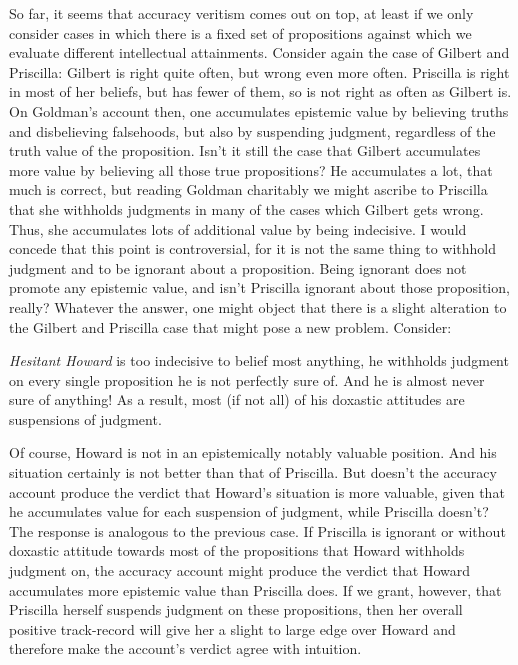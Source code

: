\documentclass[12pt,numbers=noenddot]{scrartcl}
\begin{document}
So far, it seems that accuracy veritism comes out on top, at least if we only consider cases in which there is a fixed set of propositions against which we evaluate different intellectual attainments. Consider again the case of Gilbert and Priscilla: Gilbert is right quite often, but wrong even more often. Priscilla is right in most of her beliefs, but has fewer of them, so is not right as often as Gilbert is. On Goldman's account then, one accumulates epistemic value by believing truths and disbelieving falsehoods, but also by suspending judgment, regardless of the truth value of the proposition. Isn't it still the case that Gilbert accumulates more value by believing all those true propositions? He accumulates a lot, that much is correct, but reading Goldman charitably we might ascribe to Priscilla that she withholds judgments in many of the cases which Gilbert gets wrong. Thus, she accumulates lots of additional value by being indecisive. I would concede that this point is controversial, for it is not the same thing to withhold judgment and to be ignorant about a proposition. Being ignorant does not promote any epistemic value, and isn't Priscilla ignorant about those proposition, really? Whatever the answer, one might object that there is a slight alteration to the Gilbert and Priscilla case that might pose a new problem. Consider:

\begin{description}
    \item \emph{Hesitant Howard} is too indecisive to belief most anything, he withholds judgment on every single proposition he is not perfectly sure of. And he is almost never sure of anything! As a result, most (if not all) of his doxastic attitudes are suspensions of judgment.
\end{description}

Of course, Howard is not in an epistemically notably valuable position. And his situation certainly is not better than that of Priscilla. But doesn't the accuracy account produce the verdict that Howard's situation is more valuable, given that he accumulates value for each suspension of judgment, while Priscilla doesn't? The response is analogous to the previous case. If Priscilla is ignorant or without doxastic attitude towards most of the propositions that Howard withholds judgment on, the accuracy account might produce the verdict that Howard accumulates more epistemic value than Priscilla does. If we grant, however, that Priscilla herself suspends judgment on these propositions, then her overall positive track-record will give her a slight to large edge over Howard and therefore make the account's verdict agree with intuition.
\end{document}
